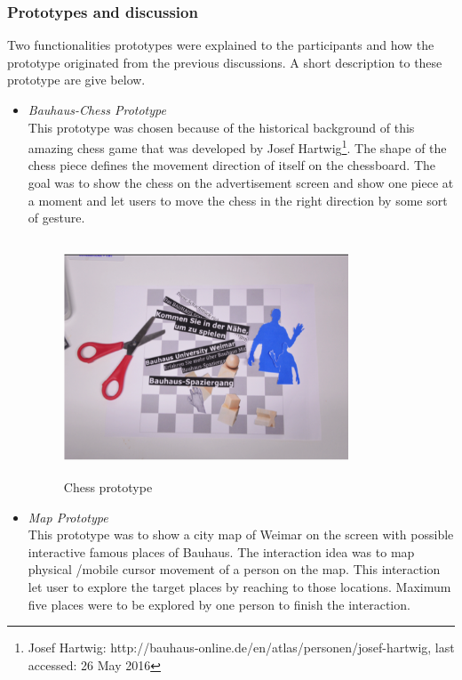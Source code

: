 \subsubsection{Prototypes and discussion}
Two functionalities prototypes were explained to the participants and how the prototype originated from the previous discussions. A short description to these prototype are give below. 
\begin{itemize}
\item \emph{Bauhaus-Chess Prototype } \\
This prototype was chosen because of the historical background of this amazing chess game that was developed by Josef Hartwig\footnote{Josef Hartwig: http://bauhaus-online.de/en/atlas/personen/josef-hartwig, last accessed: 26 May 2016}. The shape of the chess piece defines the movement direction of itself on the chessboard. The goal was to show the chess on the advertisement screen and show one piece at a moment and let users to move the chess in the right direction by some sort of gesture.


\begin{figure}[H]
\centering
\includegraphics[width=0.8\textwidth,height=7cm]{Figures/4/chess}
\caption{Chess prototype }
\label{fig:chesspro}
\end{figure}


\item \emph{Map Prototype} \\
This prototype was to show a city map of Weimar on the screen with possible interactive famous places of Bauhaus. The interaction idea was to map physical /mobile cursor movement of a person on the map. This interaction let user to explore the target places by reaching to those locations. Maximum five places were to be explored by one person to finish the interaction.



\end{itemize}
